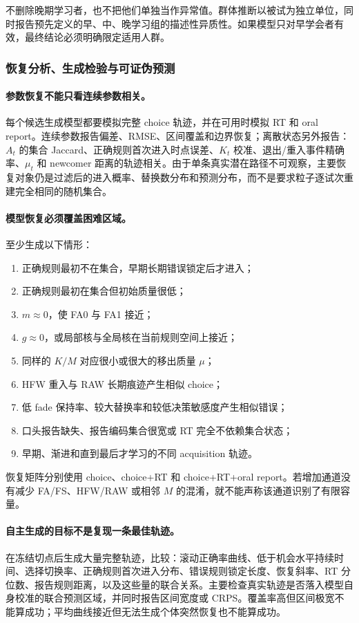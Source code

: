 不删除晚期学习者，也不把他们单独当作异常值。群体推断以被试为独立单位，同时报告预先定义的早、中、晚学习组的描述性异质性。如果模型只对早学会者有效，最终结论必须明确限定适用人群。


\subsubsection{恢复分析、生成检验与可证伪预测}

\paragraph{参数恢复不能只看连续参数相关。}
每个候选生成模型都要模拟完整 choice 轨迹，并在可用时模拟 RT 和 oral report。连续参数报告偏差、RMSE、区间覆盖和边界恢复；离散状态另外报告：$A_t$ 的集合 Jaccard、正确规则首次进入时点误差、$K_t$ 校准、退出/重入事件精确率、$\mu_t$ 和 newcomer 距离的轨迹相关。由于单条真实潜在路径不可观察，主要恢复对象仍是过滤后的进入概率、替换数分布和预测分布，而不是要求粒子逐试次重建完全相同的随机集合。

\paragraph{模型恢复必须覆盖困难区域。}
至少生成以下情形：
\begin{enumerate}
    \item 正确规则最初不在集合，早期长期错误锁定后才进入；
    \item 正确规则最初在集合但初始质量很低；
    \item $m\approx0$，使 FA0 与 FA1 接近；
    \item $g\approx0$，或局部核与全局核在当前规则空间上接近；
    \item 同样的 $K/M$ 对应很小或很大的移出质量 $\mu$；
    \item HFW 重入与 RAW 长期痕迹产生相似 choice；
    \item 低 fade 保持率、较大替换率和较低决策敏感度产生相似错误；
    \item 口头报告缺失、报告编码集合很宽或 RT 完全不依赖集合状态；
    \item 早期、渐进和直到最后才学习的不同 acquisition 轨迹。
\end{enumerate}
恢复矩阵分别使用 choice、choice+RT 和 choice+RT+oral report。若增加通道没有减少 FA/FS、HFW/RAW 或相邻 $M$ 的混淆，就不能声称该通道识别了有限容量。

\paragraph{自主生成的目标不是复现一条最佳轨迹。}
在冻结切点后生成大量完整轨迹，比较：滚动正确率曲线、低于机会水平持续时间、选择切换率、正确规则首次进入分布、错误规则锁定长度、恢复斜率、RT 分位数、报告规则距离，以及这些量的联合关系。主要检查真实轨迹是否落入模型自身校准的联合预测区域，并同时报告区间宽度或 CRPS。覆盖率高但区间极宽不能算成功；平均曲线接近但无法生成个体突然恢复也不能算成功。

